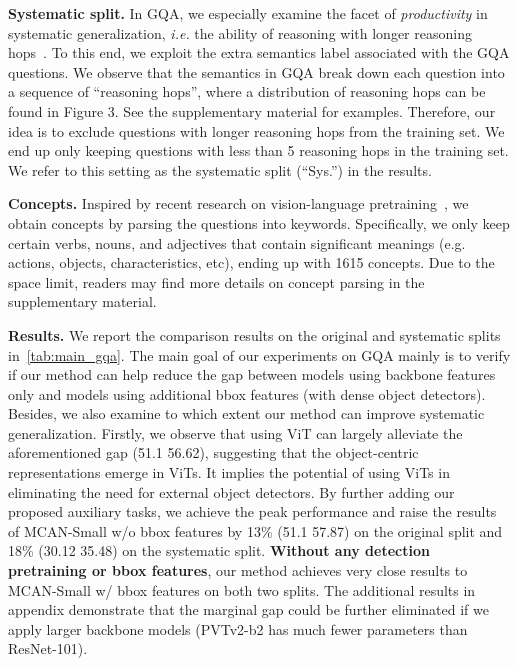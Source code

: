 \documentclass{article} \usepackage{iclr2022_conference,times}
\renewcommand{\paragraph}[1]{\noindent\textbf{#1.}}
\begin{document}
\paragraph{Systematic split} In GQA, we especially examine the facet of \emph{productivity} in systematic generalization, \emph{i.e.} the ability of reasoning with longer reasoning hops~\citep{systematic1}. To this end, we exploit the extra semantics label associated with the GQA questions. We observe that the semantics in GQA break down each question into a sequence of ``reasoning hops'', where a distribution of reasoning hops can be found in Figure 3. See the supplementary material for examples. Therefore, our idea is to exclude questions with longer reasoning hops from the training set.  We end up only keeping questions with less than 5 reasoning hops in the training set. We refer to this setting as the systematic split (``Sys.'') in the results.

\paragraph{Concepts} Inspired by recent research on vision-language pretraining~\citep{tan2019lxmert,li2019visualbert,li2020oscar}, we obtain concepts by parsing the questions into keywords. Specifically, we only keep certain verbs, nouns, and adjectives that contain significant meanings (e.g. actions, objects, characteristics, etc), ending up with 1615 concepts. 
Due to the space limit, readers may find more details on concept parsing in the supplementary material. 

\paragraph{Results} We report the comparison results on the original and systematic splits in~\autoref{tab:main_gqa}. The main goal of our experiments on GQA mainly is to verify if 
our method can help reduce the gap between models using backbone features only and models using additional bbox features (with dense object detectors). Besides, we also examine to which extent our method can improve systematic generalization.
Firstly, we observe that using ViT can largely alleviate the aforementioned gap (51.1  56.62), suggesting that the object-centric representations emerge in ViTs. It implies the potential of using ViTs in eliminating the need for external object detectors. By further adding our proposed auxiliary tasks, we achieve the peak performance and raise the results of MCAN-Small w/o bbox features by 13\% (51.1  57.87) on the original split and 18\% (30.12  35.48) on the systematic split.
\textbf{Without any detection pretraining or bbox features}, 
our method achieves very close results to MCAN-Small w/ bbox features on both two splits.
The additional results in appendix demonstrate that the marginal gap could be further eliminated if we apply larger backbone models (PVTv2-b2 has much fewer parameters than ResNet-101).
\end{document}
